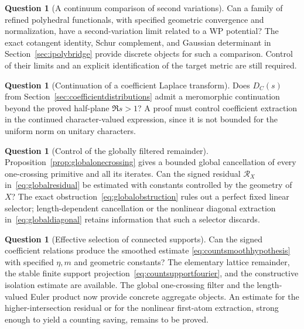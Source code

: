 \documentclass[11pt,a4paper]{article}
\numberwithin{equation}{section}
\theoremstyle{definition}
\newtheorem{question}[theorem]{Question}
\theoremstyle{remark}
\begin{document}
\begin{question}[A continuum comparison of second variations]
Can a family of refined polyhedral functionals, with specified geometric
convergence and normalization, have a second-variation limit related to
a WP potential? The exact cotangent identity, Schur complement, and
Gaussian determinant in Section~\ref{sec:ipolybridge} provide discrete
objects for such a comparison. Control of their limits and an explicit
identification of the target metric are still required.
\end{question}

\begin{question}[Continuation of a coefficient Laplace transform]
Does $D_C(s)$ from Section~\ref{sec:coefficientdistributions} admit a
meromorphic continuation beyond the proved half-plane $\Re s>1$?
A proof must control coefficient extraction in the continued
character-valued expression, since it is not bounded for the
uniform norm on unitary characters.
\end{question}

\begin{question}[Control of the globally filtered remainder]
Proposition~\ref{prop:globalonecrossing} gives a bounded global
cancellation of every one-crossing primitive and all its iterates.
Can the signed residual $\mathcal R_X$ in~\eqref{eq:globalresidual}
be estimated with constants controlled by the geometry of $X$?
The exact obstruction~\eqref{eq:globalobstruction} rules out a
perfect fixed linear selector; length-dependent cancellation or
the nonlinear diagonal extraction in~\eqref{eq:globaldiagonal}
retains information that such a selector discards.
\end{question}

\begin{question}[Effective selection of connected supports]
Can the signed coefficient relations produce the smoothed estimate
\eqref{eq:countsmoothhypothesis} with specified $\eta,m$ and geometric
constants? The elementary lattice remainder, the stable finite support
projection~\eqref{eq:countsupportfourier}, and the constructive isolation
estimate are available. The global one-crossing filter and the
length-valued Euler product now provide concrete aggregate objects.
An estimate for the higher-intersection residual or for the nonlinear
first-atom extraction, strong enough to yield a counting saving,
remains to be proved.
\end{question}
\end{document}

